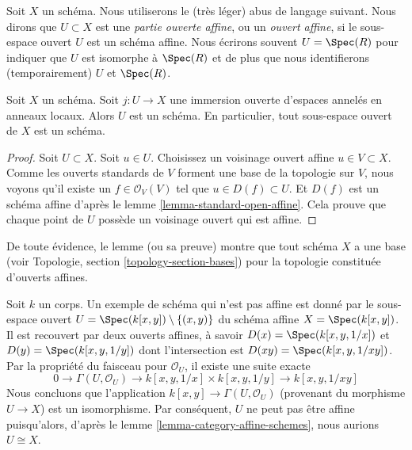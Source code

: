 \noindent
Soit $X$ un schéma. Nous
utiliserons le (très léger) abus de langage suivant. Nous
dirons que $U \subset X$ est une {\it partie ouverte affine}, ou un {\it ouvert
affine}, si le sous-espace ouvert $U$ est un schéma affine. Nous
écrirons souvent $U = \Spec(R)$ pour indiquer que $U$ est
isomorphe à $\Spec(R)$ et de plus que nous identifierons (temporairement)
$U$ et $\Spec(R)$.

\begin{lemma}
\label{lemma-open-subspace-scheme}
Soit $X$ un schéma. Soit $j : U \to X$ une immersion ouverte d'espaces
annelés en anneaux locaux. Alors $U$ est un schéma. En particulier, tout
sous-espace ouvert de $X$ est un schéma.
\end{lemma}

\begin{proof}
Soit $U \subset X$. Soit $u \in U$.
Choisissez un voisinage ouvert affine $u \in V \subset X$.
Comme les ouverts standards de $V$ forment une base de la
topologie sur $V$, nous voyons qu'il existe un $f\in \mathcal{O}_V(V)$
tel que $u \in D(f) \subset U$. Et $D(f)$ est un schéma affine
d'après le lemme \ref{lemma-standard-open-affine}. Cela prouve que chaque point
de $U$ possède un voisinage ouvert qui est affine.
\end{proof}

\noindent
De toute évidence, le lemme (ou sa preuve) montre que tout
schéma $X$ a une base (voir Topologie, section \ref{topology-section-bases})
pour la topologie constituée d'ouverts affines.

\begin{example}
\label{example-not-affine}
Soit $k$ un corps. Un
exemple de schéma qui n'est pas affine est donné
par le sous-espace ouvert $U
= \Spec(k[x, y]) \setminus \{ (x, y)\}$ du
schéma affine $X =\Spec(k[x, y])$. Il est
recouvert par deux ouverts affines, à savoir $D(x) = \Spec(k[x, y, 1/x])$
et $D(y) = \Spec(k[x, y, 1/y])$ dont l'intersection est
$D(xy) = \Spec(k[x, y, 1/xy])$. Par la propriété du faisceau
pour $\mathcal{O}_U$, il existe une suite exacte
$$
0 \to
\Gamma(U, \mathcal{O}_U) \to
k[x, y, 1/x] \times k[x, y, 1/y] \to
k[x, y, 1/xy]
$$
Nous concluons que l'application $k[x, y] \to \Gamma(U, \mathcal{O}_U)$
(provenant du morphisme $U \to X$) est un isomorphisme. Par
conséquent, $U$ ne peut pas être affine puisqu'alors, d'après
le lemme \ref{lemma-category-affine-schemes}, nous aurions $U \cong X$.
\end{example}












